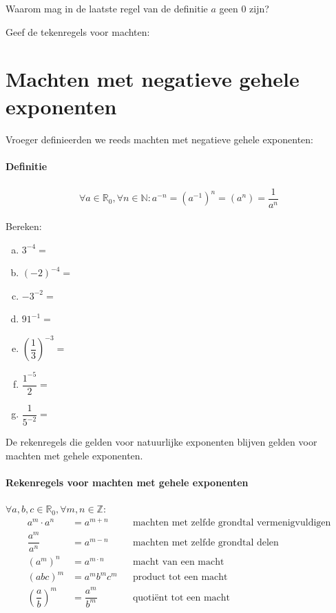 \documentclass[12pt,twoside]{article}
\begin{document}
\begin{oefening}
Waarom mag in de laatste regel van de definitie $a$ geen $0$ zijn?
\end{oefening}

\begin{oefening}
Geef de tekenregels voor machten:
\end{oefening}

\section{Machten met negatieve gehele exponenten}

Vroeger definieerden we reeds machten met negatieve gehele exponenten:
\paragraph*{Definitie}
\begin{mdframed}
\begin{align*}
\forall a \in \mathbb{R}_0, \forall n\in \mathbb{N}: a^{-n} = \left(a^{-1}\right)^n=\left(a^n\right)=\dfrac{1}{a^n}
\end{align*}
\end{mdframed}

\begin{oefening}
Bereken:
\begin{enumerate}[(a)]
  \itemsep1em
  \item $3^{-4}=$\arulefill
  \item $(-2)^{-4}=$\arulefill
  \item $-3^{-2}=$\arulefill
  \item $91^{-1}=$\arulefill
  \item $\left(\dfrac{1}{3}\right)^{-3}=$\arulefill
  \item $\dfrac{1^{-5}}{2}=$\arulefill
  \item $\dfrac{1}{5^{-2}}=$\arulefill
\end{enumerate}
\end{oefening}

De rekenregels die gelden voor natuurlijke exponenten blijven gelden voor machten met gehele exponenten.

\paragraph*{Rekenregels voor machten met gehele exponenten}
\begin{mdframed}
$\forall a, b, c \in \mathbb{R}_0, \forall m, n\in \mathbb{Z}:$
\begin{align*}
a^m\cdot a^n &= a^{m+n} && \mbox{machten met zelfde grondtal vermenigvuldigen}\\
\dfrac{a^m}{a^n} &= a^{m-n} && \mbox{machten met zelfde grondtal delen}\\
\left(a^m\right)^n &= a^{m\cdot n} && \mbox{macht van een macht}\\
\left(abc\right)^m &= a^mb^mc^m && \mbox{product tot een macht}\\
\left(\dfrac{a}{b}\right)^m &= \dfrac{a^m}{b^m} && \mbox{quotiënt tot een macht}\\
\end{align*}
\end{mdframed}
\end{document}
